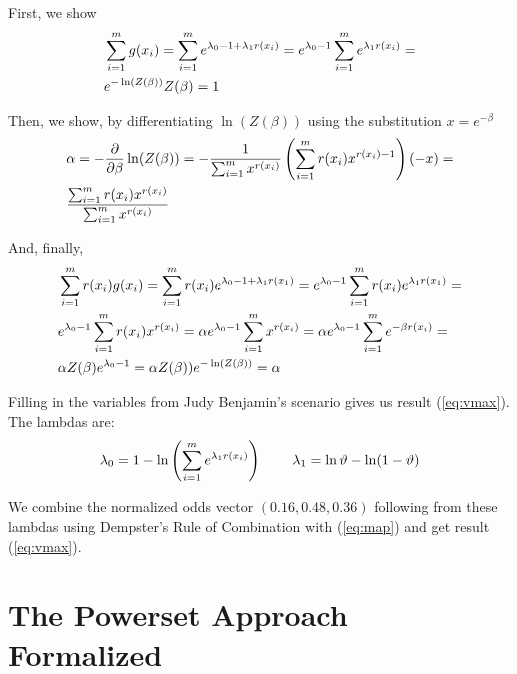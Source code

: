 \documentclass[smallextended]{svjour3}       %
\newcommand{\qvu}[0]{\vartheta}
\begin{document}
First, we show
\begin{align}
&\sum_{i=1}^{m}g(x_{i})=\sum_{i=1}^{m}e^{\lambda_{0}-1+\lambda_{1}r(x_{i})}=e^{\lambda_{0}-1}\sum_{i=1}^{m}e^{\lambda_{1}r(x_{i})}=\notag\\
&e^{-\ln(Z(\beta))}Z(\beta)=1\label{eq:unishow}\notag
\end{align}

Then, we show, by differentiating $\ln(Z(\beta))$ using the
substitution $x=e^{-\beta}$
\begin{align}
&\alpha=-\frac{\partial}{\partial{}\beta}\ln(Z(\beta))=-\frac{1}{\sum_{i=1}^{m}x^{r(x_{i})}}\left(\sum_{i=1}^{m}r(x_{i})x^{r(x_{i})-1}\right)(-x)=\notag\\
&\frac{\sum_{i=1}^{m}r(x_{i})x^{r(x_{i})}}{\sum_{i=1}^{m}x^{r(x_{i})}}\notag
\end{align}

And, finally,
\begin{align}
&\sum_{i=1}^{m}r(x_{i})g(x_{i})=\sum_{i=1}^{m}r(x_{i})e^{\lambda_{0}-1+\lambda_{1}r(x_{1})}=e^{\lambda_{0}-1}\sum_{i=1}^{m}r(x_{i})e^{\lambda_{1}r(x_{1})}=\notag\\
&e^{\lambda_{0}-1}\sum_{i=1}^{m}r(x_{i})x^{r(x_{i})}=\alpha{}e^{\lambda_{0}-1}\sum_{i=1}^{m}x^{r(x_{i})}=\alpha{}e^{\lambda_{0}-1}\sum_{i=1}^{m}e^{-\beta{}r(x_{i})}=\notag\\
&\alpha{}Z(\beta)e^{\lambda_{0}-1}=\alpha{}Z(\beta))e^{-\ln(Z(\beta))}=\alpha\notag
\end{align}

Filling in the variables from Judy Benjamin's scenario gives us result
({\ref{eq:vmax}}). The lambdas are:
  \begin{displaymath}
    \lambda_{0}=1-\ln\left(\sum_{i=1}^{m}e^{\lambda_{1}r(x_{i})}\right)\hspace{.3in}
    \lambda_{1}=\ln{}{\qvu}-\ln(1-{\qvu})\notag
  \end{displaymath}

  We combine the normalized odds vector $(0.16,0.48,0.36)$ following
  from these lambdas using Dempster's Rule of Combination with
  ({\ref{eq:map}}) and get result ({\ref{eq:vmax}}).

\section{The Powerset Approach Formalized}
\label{ThePowersetApproachFormalized}
\end{document}
